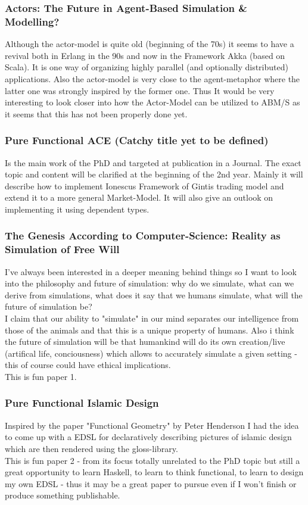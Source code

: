 \subsubsection{Actors: The Future in Agent-Based Simulation \& Modelling?}
Although the actor-model is quite old (beginning of the 70s) it seems to have a revival both in Erlang in the 90s and now in the Framework Akka (based on Scala). It is one way of organizing highly parallel (and optionally distributed) applications. Also the actor-model is very close to the agent-metaphor where the latter one was strongly inspired by the former one. Thus It would be very interesting to look closer into how the Actor-Model can be utilized to ABM/S as it seems that this has not been properly done yet.

\subsubsection{Pure Functional ACE (Catchy title yet to be defined)}
Is the main work of the PhD and targeted at publication in a Journal. The exact topic and content will be clarified at the beginning of the 2nd year. Mainly it will describe how to implement Ionescus Framework of Gintis trading model and extend it to a more general Market-Model. It will also give an outlook on implementing it using dependent types.

\subsubsection{The Genesis According to Computer-Science: Reality as Simulation of Free Will}
I've always been interested in a deeper meaning behind things so I want to look into the philosophy and future of simulation: why do we simulate, what can we derive from simulations, what does it say that we humans simulate, what will the future of simulation be? \\
I claim that our ability to "simulate" in our mind separates our intelligence from those of the animals and that this is a unique property of humans. Also i think the future of simulation will be that humankind will do its own creation/live (artifical life, conciousness) which allows to accurately simulate a given setting - this of course could have ethical implications. \\
This is fun paper 1.

\subsubsection{Pure Functional Islamic Design}
Inspired by the paper "Functional Geometry" by Peter Henderson I had the idea to come up with a  EDSL for declaratively describing pictures of islamic design which are then rendered using the gloss-library. \\
This is fun paper 2 - from its focus totally unrelated to the PhD topic but still a great opportunity to learn Haskell, to learn to think functional, to learn to design my own EDSL - thus it may be a great paper to pursue even if I won't finish or produce something publishable.